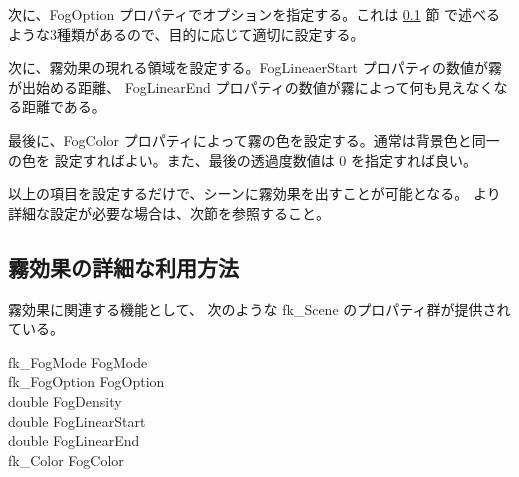 次に、FogOption プロパティでオプションを指定する。これは \ref{subsec:scenefogref} 節
で述べるような3種類があるので、目的に応じて適切に設定する。

次に、霧効果の現れる領域を設定する。FogLineaerStart プロパティの数値が霧が出始める距離、
FogLinearEnd プロパティの数値が霧によって何も見えなくなる距離である。

最後に、FogColor プロパティによって霧の色を設定する。通常は背景色と同一の色を
設定すればよい。また、最後の透過度数値は 0 を指定すれば良い。

以上の項目を設定するだけで、シーンに霧効果を出すことが可能となる。
より詳細な設定が必要な場合は、次節を参照すること。
\subsection{霧効果の詳細な利用方法} \label{subsec:scenefogref}
霧効果に関連する機能として、
次のような fk\_Scene のプロパティ群が提供されている。
\begin{description}
\item[fk\_FogMode FogMode]
\item[fk\_FogOption FogOption]
\item[double FogDensity]
\item[double FogLinearStart]
\item[double FogLinearEnd]
\item[fk\_Color FogColor]
\end{description}


